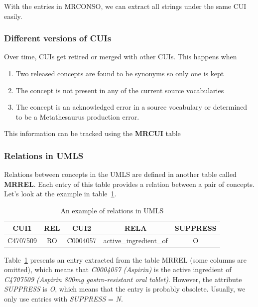 With the entries in MRCONSO, we can extract all strings under the same CUI easily. \par

\subsubsection{Different versions of CUIs}
Over time, CUIs get retired or merged with other CUIs. This happens when
\begin{enumerate}
\item Two released concepts are found to be synonyms so only one is kept 
\item The concept is not present in any of the current source vocabularies
\item The concept is an acknowledged error in a source vocabulary or determined to be a Metathesaurus production error.
\end{enumerate}

This information can be tracked using the \textbf{MRCUI} table

\subsubsection{Relations in UMLS}
Relations between concepts in the UMLS are defined in another table called \textbf{MRREL}. Each entry of this table provides a relation between a pair of concepts. Let's look at the example in table~\ref{tab:relations example}. \par

\begin{table}[ht]
\centering
\caption{An example of relations in UMLS}
\label{tab:relations example}
\begin{tabular}{ccccc}
\toprule
\textbf{CUI1} & \textbf{REL} & \textbf{CUI2} & \textbf{RELA}          & \textbf{SUPPRESS} \\ \midrule
C4707509      & RO           & C0004057      & active\_ingredient\_of & O                 \\ \bottomrule
\end{tabular}
\end{table}

Table~\ref{tab:relations example} presents an entry extracted from the table MRREL (some columns are omitted), which means that \emph{C0004057 (Aspirin)} is the active ingredient of \emph{C4707509 (Aspirin 800mg gastro-resistant oral tablet)}. However, the attribute \emph{SUPPRESS} is \emph{O}, which means that the entry is probably obsolete. Usually, we only use entries with  \emph{SUPPRESS} = \emph{N}. \par

